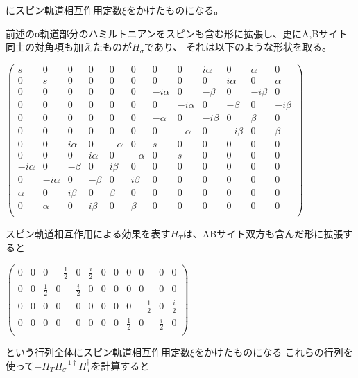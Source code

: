 \documentclass{article}
\begin{document}
にスピン軌道相互作用定数$\xi$をかけたものになる。

前述のσ軌道部分のハミルトニアンをスピンも含む形に拡張し、更にA,Bサイト同士の対角項も加えたものが$H_\sigma$であり、
それは以下のような形状を取る。

\begin{doublespace}
\noindent\(\left(
\begin{array}{cccccccccccc}
 s & 0 & 0 & 0 & 0 & 0 & 0 & 0 & i \alpha  & 0 & \alpha  & 0 \\
 0 & s & 0 & 0 & 0 & 0 & 0 & 0 & 0 & i \alpha  & 0 & \alpha  \\
 0 & 0 & 0 & 0 & 0 & 0 & -i \alpha  & 0 & -\beta  & 0 & -i \beta  & 0 \\
 0 & 0 & 0 & 0 & 0 & 0 & 0 & -i \alpha  & 0 & -\beta  & 0 & -i \beta  \\
 0 & 0 & 0 & 0 & 0 & 0 & -\alpha  & 0 & -i \beta  & 0 & \beta  & 0 \\
 0 & 0 & 0 & 0 & 0 & 0 & 0 & -\alpha  & 0 & -i \beta  & 0 & \beta  \\
 0 & 0 & i \alpha  & 0 & -\alpha  & 0 & s & 0 & 0 & 0 & 0 & 0 \\
 0 & 0 & 0 & i \alpha  & 0 & -\alpha  & 0 & s & 0 & 0 & 0 & 0 \\
 -i \alpha  & 0 & -\beta  & 0 & i \beta  & 0 & 0 & 0 & 0 & 0 & 0 & 0 \\
 0 & -i \alpha  & 0 & -\beta  & 0 & i \beta  & 0 & 0 & 0 & 0 & 0 & 0 \\
 \alpha  & 0 & i \beta  & 0 & \beta  & 0 & 0 & 0 & 0 & 0 & 0 & 0 \\
 0 & \alpha  & 0 & i \beta  & 0 & \beta  & 0 & 0 & 0 & 0 & 0 & 0 \\
\end{array}
\right)\)
\end{doublespace}

スピン軌道相互作用による効果を表す$H_T$は、ABサイト双方も含んだ形に拡張すると

\begin{doublespace}
\noindent\(\left(
\begin{array}{cccccccccccc}
 0 & 0 & 0 & -\frac{1}{2} & 0 & \frac{i}{2} & 0 & 0 & 0 & 0 & 0 & 0 \\
 0 & 0 & \frac{1}{2} & 0 & \frac{i}{2} & 0 & 0 & 0 & 0 & 0 & 0 & 0 \\
 0 & 0 & 0 & 0 & 0 & 0 & 0 & 0 & 0 & -\frac{1}{2} & 0 & \frac{i}{2} \\
 0 & 0 & 0 & 0 & 0 & 0 & 0 & 0 & \frac{1}{2} & 0 & \frac{i}{2} & 0 \\
\end{array}
\right)\)
\end{doublespace}
という行列全体にスピン軌道相互作用定数$\xi$をかけたものになる
これらの行列を使って$-H_T
H_\sigma^{-1\dagger}H_T^\dagger$を計算すると
\end{document}
